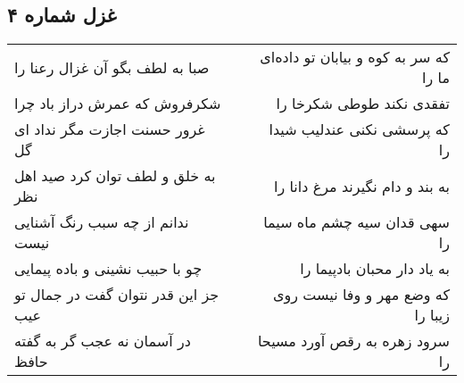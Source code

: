 \begin{center}
\section*{غزل شماره ۴}
\label{sec:sh004}
\begin{longtable}{l p{0.5cm} r}
صبا به لطف بگو آن غزال رعنا را
&&
که سر به کوه و بیابان تو داده‌ای ما را
\\
شکرفروش که عمرش دراز باد چرا
&&
تفقدی نکند طوطی شکرخا را
\\
غرور حسنت اجازت مگر نداد ای گل
&&
که پرسشی نکنی عندلیب شیدا را
\\
به خلق و لطف توان کرد صید اهل نظر
&&
به بند و دام نگیرند مرغ دانا را
\\
ندانم از چه سبب رنگ آشنایی نیست
&&
سهی قدان سیه چشم ماه سیما را
\\
چو با حبیب نشینی و باده پیمایی
&&
به یاد دار محبان بادپیما را
\\
جز این قدر نتوان گفت در جمال تو عیب
&&
که وضع مهر و وفا نیست روی زیبا را
\\
در آسمان نه عجب گر به گفته حافظ
&&
سرود زهره به رقص آورد مسیحا را
\\
\end{longtable}
\end{center}
